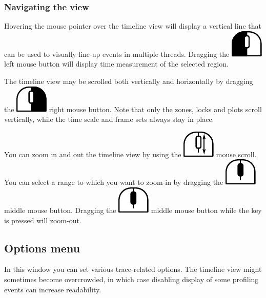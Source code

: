 \documentclass[hidelinks,titlepage,a4paper]{article}
\newcommand{\LMB}{\includegraphics[height=.8\baselineskip]{icons/lmb}}
\newcommand{\RMB}{\includegraphics[height=.8\baselineskip]{icons/rmb}}
\newcommand{\MMB}{\includegraphics[height=.8\baselineskip]{icons/mmb}}
\newcommand{\Scroll}{\includegraphics[height=.8\baselineskip]{icons/scroll}}
\begin{document}
\subsubsection{Navigating the view}

Hovering the \faMousePointer{} mouse pointer over the timeline view will display a vertical line that can be used to visually line-up events in multiple threads. Dragging the \LMB{} left mouse button will display time measurement of the selected region.

The timeline view may be scrolled both vertically and horizontally by dragging the \RMB{} right mouse button. Note that only the zones, locks and plots scroll vertically, while the time scale and frame sets always stay in place.

You can zoom in and out the timeline view by using the \Scroll{} mouse scroll. You can select a range to which you want to zoom-in by dragging the \MMB{} middle mouse button. Dragging the \MMB{} middle mouse button while the \keys{\ctrl} key is pressed will zoom-out.

\subsection{Options menu}
\label{options}

In this window you can set various trace-related options. The timeline view might sometimes become overcrowded, in which case disabling display of some profiling events can increase readability.
\end{document}
